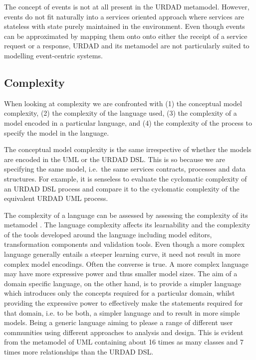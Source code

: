 The concept of events is not at all present in the URDAD metamodel. However, events do not fit naturally into a services oriented approach where services are stateless with state purely maintained in the environment. Even though events can be approximated by mapping them onto onto either the receipt of a service request or a response, URDAD and its metamodel are not particularly suited to modelling event-centric systems.


\subsection{Complexity}

When looking at complexity we are confronted with (1) the conceptual model complexity, (2) the complexity of the language used, (3) the complexity of a model encoded in a particular language, and (4) the complexity of the process to specify the model in the language. 

The conceptual model complexity is the same irrespective of whether the models are encoded in the UML or the URDAD DSL. This is so because we are specifying the same model, i.e.\ the same services contracts, processes and data structures. For example, it is senseless to evaluate the cyclomatic complexity \cite{mccabe_complexity_1976} of an URDAD DSL process and compare it to the cyclomatic complexity of the equivalent URDAD UML process.

The complexity of a language can be assessed by assessing the complexity of its metamodel \cite{mohagheghi_evaluating_2007}. The language complexity affects its learnability and the complexity of the tools developed around the language including model editors, transformation components and validation tools. Even though a more complex language generally entails a steeper learning curve, it need not result in more complex model encodings. Often the converse is true. A more complex language may have more expressive power and thus smaller model sizes. The aim of a domain specific language, on the other hand, is to provide a simpler language which introduces only the concepts required for a particular domain, whilst providing the expressive power to effectively make the statements required for that domain, i.e. to be both, a simpler language and to result in more simple models. Being a generic language aiming to please a range of different user communities using different approaches to analysis and design. This is evident from the metamodel of UML containing about 16 times as many classes and 7 times more relationships than the URDAD DSL.

